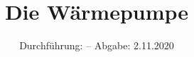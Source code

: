 

\subject{VERSUCH D206}
\title{Die Wärmepumpe}
\date{%
  Durchführung: --
  \hspace{3em}
  Abgabe: 2.11.2020
}



\maketitle
\thispagestyle{empty}
\tableofcontents
\newpage






\printbibliography{}


